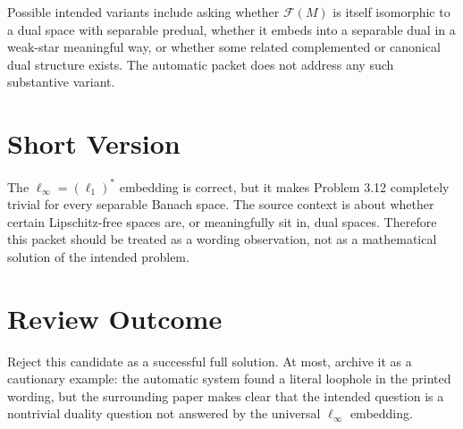 \documentclass[11pt]{article}
\newcommand{\F}{\mathcal F}
\begin{document}
Possible intended variants include asking whether \(\F(M)\) is itself
isomorphic to a dual space with separable predual, whether it embeds into a
separable dual in a weak-star meaningful way, or whether some related
complemented or canonical dual structure exists.  The automatic packet does
not address any such substantive variant.

\section*{Short Version}

The \(\ell_\infty=(\ell_1)^*\) embedding is correct, but it makes Problem
3.12 completely trivial for every separable Banach space.  The source context
is about whether certain Lipschitz-free spaces are, or meaningfully sit in,
dual spaces.  Therefore this packet should be treated as a wording observation,
not as a mathematical solution of the intended problem.

\section*{Review Outcome}

Reject this candidate as a successful full solution.  At most, archive it as a
cautionary example: the automatic system found a literal loophole in the
printed wording, but the surrounding paper makes clear that the intended
question is a nontrivial duality question not answered by the universal
\(\ell_\infty\) embedding.
\end{document}
